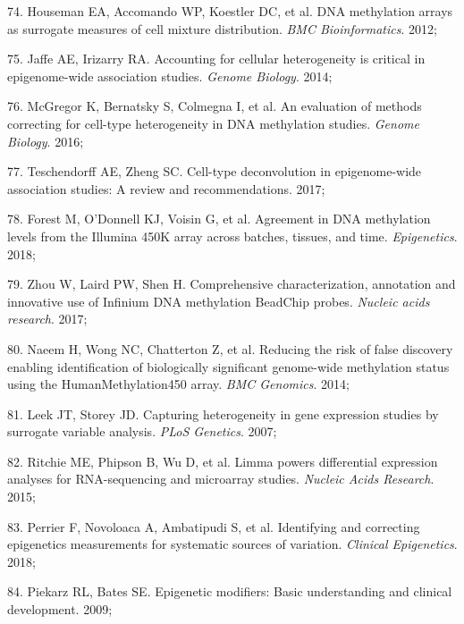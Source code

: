 \documentclass[11pt,oneside]{bristolthesis}
\newenvironment{cslreferences}%
  {}%
  {\par}
\begin{document}
\begin{cslreferences}
\leavevmode\hypertarget{ref-Houseman2012}{}%
74. Houseman EA, Accomando WP, Koestler DC, et al. DNA methylation arrays as surrogate measures of cell mixture distribution. \emph{BMC Bioinformatics}. 2012;

\leavevmode\hypertarget{ref-Jaffe2014}{}%
75. Jaffe AE, Irizarry RA. Accounting for cellular heterogeneity is critical in epigenome-wide association studies. \emph{Genome Biology}. 2014;

\leavevmode\hypertarget{ref-McGregor2016}{}%
76. McGregor K, Bernatsky S, Colmegna I, et al. An evaluation of methods correcting for cell-type heterogeneity in DNA methylation studies. \emph{Genome Biology}. 2016;

\leavevmode\hypertarget{ref-Teschendorff2017}{}%
77. Teschendorff AE, Zheng SC. Cell-type deconvolution in epigenome-wide association studies: A review and recommendations. 2017;

\leavevmode\hypertarget{ref-Forest2018}{}%
78. Forest M, O'Donnell KJ, Voisin G, et al. Agreement in DNA methylation levels from the Illumina 450K array across batches, tissues, and time. \emph{Epigenetics}. 2018;

\leavevmode\hypertarget{ref-Zhou2017}{}%
79. Zhou W, Laird PW, Shen H. Comprehensive characterization, annotation and innovative use of Infinium DNA methylation BeadChip probes. \emph{Nucleic acids research}. 2017;

\leavevmode\hypertarget{ref-Naeem2014}{}%
80. Naeem H, Wong NC, Chatterton Z, et al. Reducing the risk of false discovery enabling identification of biologically significant genome-wide methylation status using the HumanMethylation450 array. \emph{BMC Genomics}. 2014;

\leavevmode\hypertarget{ref-Leek2007}{}%
81. Leek JT, Storey JD. Capturing heterogeneity in gene expression studies by surrogate variable analysis. \emph{PLoS Genetics}. 2007;

\leavevmode\hypertarget{ref-Ritchie2015}{}%
82. Ritchie ME, Phipson B, Wu D, et al. Limma powers differential expression analyses for RNA-sequencing and microarray studies. \emph{Nucleic Acids Research}. 2015;

\leavevmode\hypertarget{ref-Perrier2018}{}%
83. Perrier F, Novoloaca A, Ambatipudi S, et al. Identifying and correcting epigenetics measurements for systematic sources of variation. \emph{Clinical Epigenetics}. 2018;

\leavevmode\hypertarget{ref-Piekarz2009}{}%
84. Piekarz RL, Bates SE. Epigenetic modifiers: Basic understanding and clinical development. 2009;


\end{cslreferences}
\end{document}
